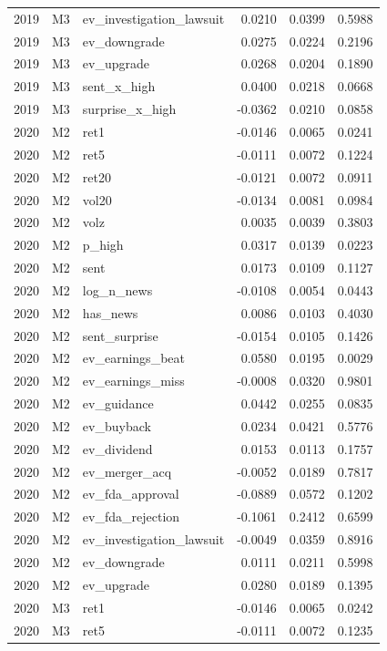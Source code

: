 \begin{tabular}{rllrrr}
2019 & M3 & ev\_investigation\_lawsuit & 0.0210 & 0.0399 & 0.5988 \\
2019 & M3 & ev\_downgrade & 0.0275 & 0.0224 & 0.2196 \\
2019 & M3 & ev\_upgrade & 0.0268 & 0.0204 & 0.1890 \\
2019 & M3 & sent\_x\_high & 0.0400 & 0.0218 & 0.0668 \\
2019 & M3 & surprise\_x\_high & -0.0362 & 0.0210 & 0.0858 \\
2020 & M2 & ret1 & -0.0146 & 0.0065 & 0.0241 \\
2020 & M2 & ret5 & -0.0111 & 0.0072 & 0.1224 \\
2020 & M2 & ret20 & -0.0121 & 0.0072 & 0.0911 \\
2020 & M2 & vol20 & -0.0134 & 0.0081 & 0.0984 \\
2020 & M2 & volz & 0.0035 & 0.0039 & 0.3803 \\
2020 & M2 & p\_high & 0.0317 & 0.0139 & 0.0223 \\
2020 & M2 & sent & 0.0173 & 0.0109 & 0.1127 \\
2020 & M2 & log\_n\_news & -0.0108 & 0.0054 & 0.0443 \\
2020 & M2 & has\_news & 0.0086 & 0.0103 & 0.4030 \\
2020 & M2 & sent\_surprise & -0.0154 & 0.0105 & 0.1426 \\
2020 & M2 & ev\_earnings\_beat & 0.0580 & 0.0195 & 0.0029 \\
2020 & M2 & ev\_earnings\_miss & -0.0008 & 0.0320 & 0.9801 \\
2020 & M2 & ev\_guidance & 0.0442 & 0.0255 & 0.0835 \\
2020 & M2 & ev\_buyback & 0.0234 & 0.0421 & 0.5776 \\
2020 & M2 & ev\_dividend & 0.0153 & 0.0113 & 0.1757 \\
2020 & M2 & ev\_merger\_acq & -0.0052 & 0.0189 & 0.7817 \\
2020 & M2 & ev\_fda\_approval & -0.0889 & 0.0572 & 0.1202 \\
2020 & M2 & ev\_fda\_rejection & -0.1061 & 0.2412 & 0.6599 \\
2020 & M2 & ev\_investigation\_lawsuit & -0.0049 & 0.0359 & 0.8916 \\
2020 & M2 & ev\_downgrade & 0.0111 & 0.0211 & 0.5998 \\
2020 & M2 & ev\_upgrade & 0.0280 & 0.0189 & 0.1395 \\
2020 & M3 & ret1 & -0.0146 & 0.0065 & 0.0242 \\
2020 & M3 & ret5 & -0.0111 & 0.0072 & 0.1235 \\

\end{tabular}
